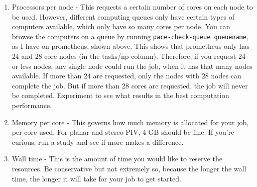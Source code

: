 \documentclass{article}
\begin{document}
\begin{enumerate}
		
		\item Processors per node - This requests a certain number of cores on each node to be used.  However, different computing queues only have certain types of computers available, which only have so many cores per node.  You can browse the computers on a queue by running \texttt{pace-check-queue queuename}, as I have on prometheus, shown above.  This shows that prometheus only has 24 and 28 core nodes (in the tasks/np column).  Therefore, if you request 24 or less nodes, any single node could run the job, when it has that many nodes available.  If more than 24 are requested, only the nodes with 28 nodes can complete the job.  But if more than 28 cores are requested, the job will never be completed.  Experiment to see what results in the best computation performance.

		\item Memory per core - This governs how much memory is allocated for your job, per core used.  For planar and stereo PIV, 4 GB should be fine.  If you're curious, run a study and see if more makes a difference.
		
		\item Wall time - This is the amount of time you would like to reserve the resources.  Be conservative but not extremely so, because the longer the wall time, the longer it will take for your job to get started.
	\end{enumerate}
\end{document}
